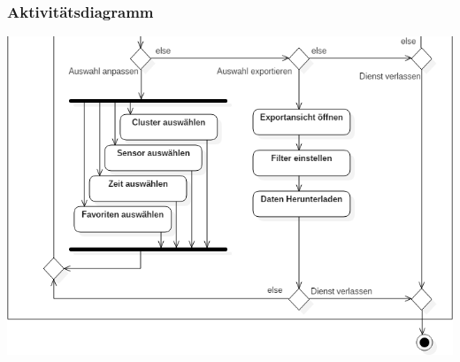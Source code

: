 \documentclass{beamer}
\begin{document}
\begin{frame}
	\frametitle{Aktivitätsdiagramm}
	\centering
	\includegraphics[width=\linewidth]{diagrams/ActivityDiagram1Bottom}
\end{frame}
\end{document}

